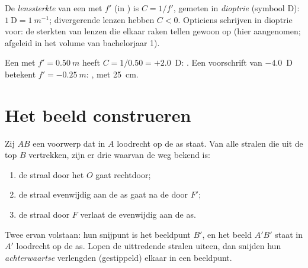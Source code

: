 \begin{definition}[Lenssterkte]\label{def:g11:lenses-and-eye:vergence}
De \emph{lenssterkte} van een  met
 $f'$ (in ) is $C = 1/f'$, gemeten in
\emph{dioptrie} (symbool D): $1~\text{D} =
\qty{1}{m^{-1}}$; divergerende lenzen hebben $C < 0$. Opticiens
schrijven in dioptrie voor: de sterkten van  lenzen die elkaar raken
tellen gewoon op (hier aangenomen; afgeleid in het volume van
bachelorjaar 1).
\end{definition}

\begin{example}\label{ex:g11:lenses-and-eye:vergence}
Een  met $f' = \qty{0.50}{m}$ heeft $C = 1/0.50 = +2.0$~D:
. Een voorschrift van $-4.0$~D betekent
$f' = \qty{-0.25}{m}$: , met  \qty{25}{cm}.
\end{example}

\section{Het beeld construeren}

\begin{method}\label{met:g11:lenses-and-eye:rays}
Zij $AB$ een voorwerp dat in $A$ loodrecht op de as staat. Van alle
stralen die uit de top $B$ vertrekken, zijn er drie waarvan de weg bekend
is:
\begin{enumerate}
  \item de straal door het  $O$ gaat rechtdoor;
  \item de straal evenwijdig aan de as gaat na de  door $F'$;
  \item de straal door $F$ verlaat de  evenwijdig aan de as.
\end{enumerate}
Twee ervan volstaan: hun snijpunt is het beeldpunt $B'$, en het beeld
$A'B'$ staat in $A'$ loodrecht op de as. Lopen de uittredende stralen
uiteen, dan snijden hun \emph{achterwaartse} verlengden (gestippeld)
elkaar in een  beeldpunt.
\end{method}

